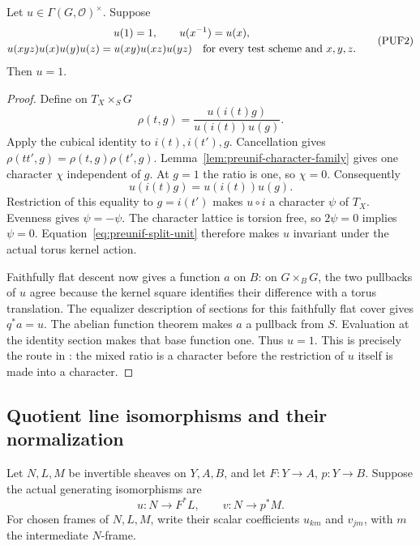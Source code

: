 \begin{srlemma}
\label{lem:preunif-even-cubic-unit}
Let \(u\in\Gamma(G,\mathcal O)^\times\).  Suppose
\[
 \begin{gathered}
 u(1)=1,\qquad u(x^{-1})=u(x),\\
 u(xyz)u(x)u(y)u(z)=u(xy)u(xz)u(yz)
 \quad\hbox{for every test scheme and }x,y,z.
 \end{gathered}
 \tag{PUF2}\label{eq:preunif-even-cube}
\]
Then \(u=1\).
\end{srlemma}
\begin{proof}
Define on \(T_X\times_S G\)
\[
       \rho(t,g)=
            \frac{u(i(t)g)}{u(i(t))u(g)}.
\]
Apply the cubical identity to \(i(t),i(t'),g\).
Cancellation gives
\(\rho(tt',g)=\rho(t,g)\rho(t',g)\).
Lemma~\ref{lem:preunif-character-family} gives one character \(\chi\)
independent of \(g\).  At \(g=1\) the ratio is one, so \(\chi=0\).
Consequently
\[
                       u(i(t)g)=u(i(t))u(g).
 \tag{PUF3}\label{eq:preunif-split-unit}
\]
Restriction of this equality to \(g=i(t')\) makes \(u\circ i\) a
character \(\psi\) of \(T_X\).  Evenness gives \(\psi=-\psi\).
The character lattice is torsion free, so \(2\psi=0\) implies
\(\psi=0\).  Equation~\eqref{eq:preunif-split-unit} therefore makes
\(u\) invariant under the actual torus kernel action.

Faithfully flat descent now gives a function \(a\) on \(B\):
on \(G\times_B G\), the two pullbacks of \(u\) agree because the
kernel square identifies their difference with a torus translation.
The equalizer description of sections for this faithfully flat
cover gives \(q^*a=u\).  The abelian function theorem makes \(a\)
a pullback from \(S\).  Evaluation at the identity section makes that
base function one.  Thus \(u=1\).  This is precisely the route in
: the mixed ratio is a character before
the restriction of \(u\) itself is made into a character.
\end{proof}

\subsection{Quotient line isomorphisms and their normalization}
Let \(N,L,M\) be invertible sheaves on \(Y,A,B\), and let
\(F:Y\to A\), \(p:Y\to B\).  Suppose the actual generating
isomorphisms are
\[
                       u:N\longrightarrow F^*L,\qquad
                       v:N\longrightarrow p^*M.
\]
For chosen frames of \(N,L,M\), write their scalar coefficients
\(u_{km}\) and \(v_{jm}\), with \(m\) the intermediate \(N\)-frame.

